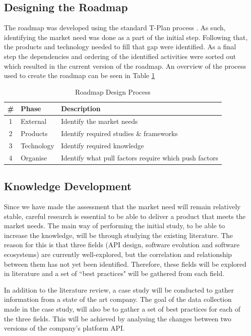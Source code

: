 \documentclass{article}
\begin{document}
\subsection{Designing the Roadmap}
The roadmap was developed using the standard T-Plan process \cite{!!!roadmap}. As such, identifying the market need was done as a part of the initial step. Following that, the products and technology needed to fill that gap were identified. As a final step the dependencies and ordering of the identified activities were sorted out which resulted in the current version of the roadmap. An overview of the process used to create the roadmap can be seen in Table \ref{tab:proc}

\begin{table}[ht]
\centering
\begin{tabular}[ht]{|c|l|l|}
\hline
\textbf{\#} & \textbf{Phase} & \textbf{Description} \\
\hline
1 & External & Identify the market needs \\
\hline
2 & Products & Identify required studies \& frameworks \\
\hline
3 & Technology & Identify required knowledge \\
\hline
4 & Organise & Identify what pull factors require which push factors \\
\hline
\end{tabular}
\caption{Roadmap Design Process}
\label{tab:proc}
\end{table}

\subsection{Knowledge Development}
Since we have made the assessment that the market need will remain relatively stable, careful research is essential to be able to deliver a product that meets the market needs. The main way of performing the initial study, to be able to increase the knowledge, will be through studying the existing literature. The reason for this is that three fields (API design, software evolution and software ecosystems) are currently well-explored, but the correlation and relationship between them has not yet been identified. Therefore, these fields will be explored in literature and a set of ``best practices" will be gathered from each field. 

In addition to the literature review, a case study will be conducted to gather information from a state of the art company. The goal of the data collection made in the case study, will also be to gather a set of best practices for each of the three fields. This will be achieved by analysing the changes between two versions of the company's platform API. 
\end{document}
